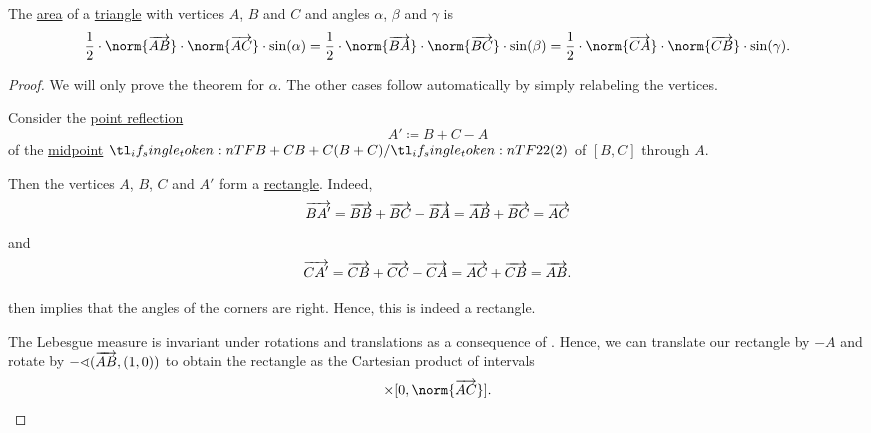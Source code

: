 \begin{proposition}\label{thm:area_of_triangle}
  The \hyperref[def:figure_area]{area} of a \hyperref[def:triangle]{triangle} with vertices \( A \), \( B \) and \( C \) and angles \( \alpha \), \( \beta \) and \( \gamma \) is
  \begin{equation}\label{eq:thm:area_of_parallelogram}
    \frac 1 2 \cdot \norm{\vect{AB}} \cdot \norm{\vect{AC}} \cdot \sin(\alpha) = \frac 1 2 \cdot \norm{\vect{BA}} \cdot \norm{\vect{BC}} \cdot \sin(\beta) = \frac 1 2 \cdot \norm{\vect{CA}} \cdot \norm{\vect{CB}} \cdot \sin(\gamma).
  \end{equation}
\end{proposition}
\begin{proof}
  We will only prove the theorem for \( \alpha \). The other cases follow automatically by simply relabeling the vertices.

   Consider the \hyperref[def:rigid_motion/point_reflection]{point reflection}
  \begin{equation*}
    A' \coloneqq B + C - A
  \end{equation*}
  of the \hyperref[def:midpoint]{midpoint} \( \ifrac {B + C} 2 \) of \( [B, C] \) through \( A \).

  Then the vertices \( A \), \( B \), \( C \) and \( A' \) form a \hyperref[def:parallelogram/rectangle]{rectangle}. Indeed,
  \begin{equation*}
    \overrightarrow{BA'} = \overrightarrow{BB} + \overrightarrow{BC} - \overrightarrow{BA} = \overrightarrow{AB} + \overrightarrow{BC} = \overrightarrow{AC}
  \end{equation*}
  and
  \begin{equation*}
    \overrightarrow{CA'} = \overrightarrow{CB} + \overrightarrow{CC} - \overrightarrow{CA} = \overrightarrow{AC} + \overrightarrow{CB} = \overrightarrow{AB}.
  \end{equation*}

   then implies that the angles of the corners are right. Hence, this is indeed a rectangle.

  The Lebesgue measure is invariant under rotations and translations as a consequence of . Hence, we can translate our rectangle by \( -A \) and rotate by \( -\sphericalangle(\overrightarrow{AB}, (1, 0)) \) to obtain the rectangle as the Cartesian product of intervals
  \begin{equation*}
    [0, \norm{\vect{AB}}] \times [0, \norm{\vect{AC}}].
  \end{equation*}


\end{proof}
